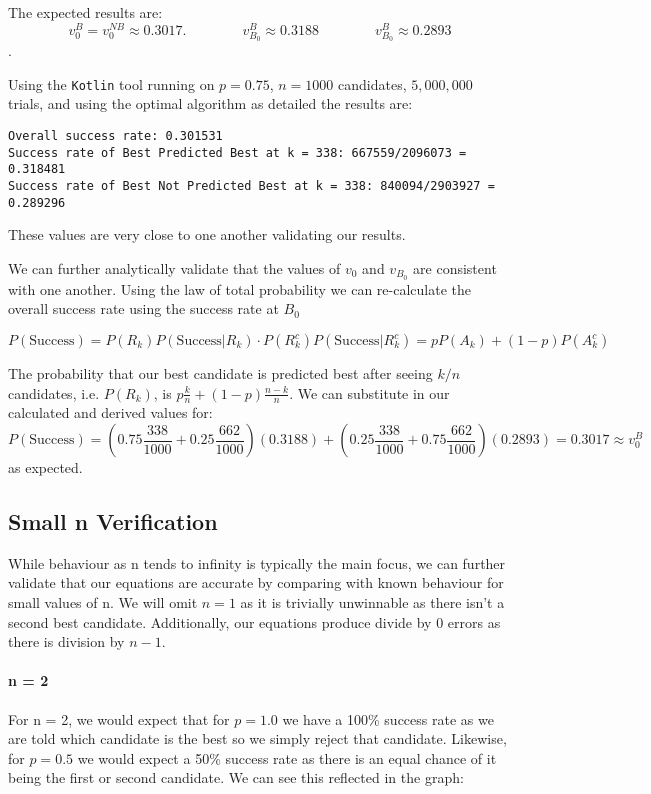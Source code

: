 \documentclass[a4paper,11pt]{article}
\begin{document}
The expected results are:
$$
v_0^B = v_0^{NB} \approx 0.3017.\hspace{4em} v^B_{B_0} \approx 0.3188 \hspace{4em}  v^B_{B_0} \approx 0.2893
$$.

Using the \verb|Kotlin| tool running on $p =0.75$, $n=1000$ candidates, $5,000,000$ trials, and using the optimal algorithm as detailed the results are:

\begin{verbatim}
Overall success rate: 0.301531
Success rate of Best Predicted Best at k = 338: 667559/2096073 = 0.318481
Success rate of Best Not Predicted Best at k = 338: 840094/2903927 = 0.289296
\end{verbatim}

These values are very close to one another validating our results.

We can further analytically validate that the values of $v_0$ and $v_{B_0}$ are consistent with one another. Using the law of total probability we can re-calculate the overall success rate using the success rate at $B_0$

$$
P(\text{Success}) = P(R_k)P(\text{Success}|R_k)\cdot P(R_k^c)P(\text{Success}|R_k^c) = pP(A_k) + (1-p)P(A_k^c)
$$

The probability that our best candidate is predicted best after seeing $k/n$ candidates, i.e. $P(R_k)$, is $p\frac{k}{n} + (1-p)\frac{n-k}{n}$. We can substitute in our calculated and derived values for:
$$
P(\text{Success}) = (0.75\frac{338}{1000} + 0.25\frac{662}{1000})(0.3188) + (0.25\frac{338}{1000} + 0.75\frac{662}{1000})(0.2893) = 0.3017 \approx v_0^B
$$
as expected.

\subsection{Small n Verification}

While behaviour as n tends to infinity is typically the main focus, we can further validate that our equations are accurate by comparing with known behaviour for small values of n. We will omit $n=1$ as it is trivially unwinnable as there isn't a second best candidate. Additionally, our equations produce divide by 0 errors as there is division by $n-1$.

\paragraph{n = 2} 

For n = 2, we would expect that for $p=1.0$ we have a 100\% success rate as we are told which candidate is the best so we simply reject that candidate. Likewise, for $p=0.5$ we would expect a 50\% success rate as there is an equal chance of it being the first or second candidate. We can see this reflected in the graph:
\end{document}
